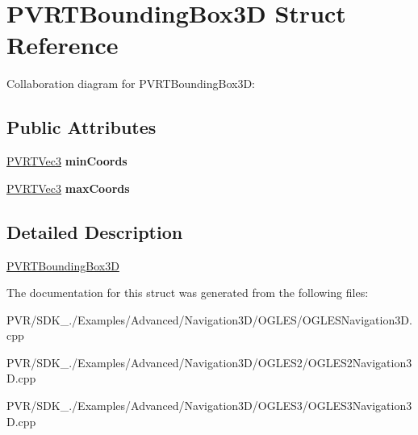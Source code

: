 \hypertarget{struct_p_v_r_t_bounding_box3_d}{\section{P\+V\+R\+T\+Bounding\+Box3\+D Struct Reference}
\label{struct_p_v_r_t_bounding_box3_d}
}


Collaboration diagram for P\+V\+R\+T\+Bounding\+Box3\+D\+:
\subsection*{Public Attributes}
\begin{DoxyCompactItemize}
\item 
\hypertarget{struct_p_v_r_t_bounding_box3_d_a9169fac9def6fcf1071aae31be548c5c}{\hyperlink{struct_p_v_r_t_vec3}{P\+V\+R\+T\+Vec3} {\bfseries min\+Coords}}\label{struct_p_v_r_t_bounding_box3_d_a9169fac9def6fcf1071aae31be548c5c}

\item 
\hypertarget{struct_p_v_r_t_bounding_box3_d_a5639fa49fa67e71766987999fb733962}{\hyperlink{struct_p_v_r_t_vec3}{P\+V\+R\+T\+Vec3} {\bfseries max\+Coords}}\label{struct_p_v_r_t_bounding_box3_d_a5639fa49fa67e71766987999fb733962}

\end{DoxyCompactItemize}


\subsection{Detailed Description}


  \hyperlink{struct_p_v_r_t_bounding_box3_d}{P\+V\+R\+T\+Bounding\+Box3\+D} 

The documentation for this struct was generated from the following files\+:\begin{DoxyCompactItemize}
\item 
P\+V\+R/\+S\+D\+K\+\_./\+Examples/\+Advanced/\+Navigation3\+D/\+O\+G\+L\+E\+S/O\+G\+L\+E\+S\+Navigation3\+D.\+cpp\item 
P\+V\+R/\+S\+D\+K\+\_./\+Examples/\+Advanced/\+Navigation3\+D/\+O\+G\+L\+E\+S2/O\+G\+L\+E\+S2\+Navigation3\+D.\+cpp\item 
P\+V\+R/\+S\+D\+K\+\_./\+Examples/\+Advanced/\+Navigation3\+D/\+O\+G\+L\+E\+S3/O\+G\+L\+E\+S3\+Navigation3\+D.\+cpp\end{DoxyCompactItemize}
